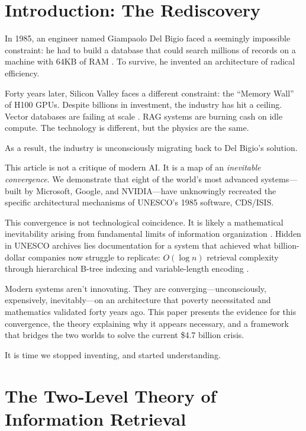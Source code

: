 \documentclass[manuscript,screen,review]{acmart}
\begin{document}
\section{Introduction: The Rediscovery}

In 1985, an engineer named Giampaolo Del Bigio faced a seemingly impossible constraint: he had to build a database that could search millions of records on a machine with 64KB of RAM \cite{delbigio1995}. To survive, he invented an architecture of radical efficiency.

Forty years later, Silicon Valley faces a different constraint: the ``Memory Wall'' of H100 GPUs. Despite billions in investment, the industry has hit a ceiling. Vector databases are failing at scale \cite{bruckhaus2024}. RAG systems are burning cash on idle compute. The technology is different, but the physics are the same.

As a result, the industry is unconsciously migrating back to Del Bigio's solution.

This article is not a critique of modern AI. It is a map of an \textit{inevitable convergence}. We demonstrate that eight of the world's most advanced systems---built by Microsoft, Google, and NVIDIA---have unknowingly recreated the specific architectural mechanisms of UNESCO's 1985 software, CDS/ISIS.

This convergence is not technological coincidence. It is likely a mathematical inevitability arising from fundamental limits of information organization \cite{weller2025}. Hidden in UNESCO archives lies documentation for a system that achieved what billion-dollar companies now struggle to replicate: $O(\log n)$ retrieval complexity through hierarchical B-tree indexing and variable-length encoding \cite{unesco1989}.

Modern systems aren't innovating. They are converging---unconsciously, expensively, inevitably---on an architecture that poverty necessitated and mathematics validated forty years ago. This paper presents the evidence for this convergence, the theory explaining why it appears necessary, and a framework that bridges the two worlds to solve the current \$4.7 billion crisis.

It is time we stopped inventing, and started understanding.

\section{The Two-Level Theory of Information Retrieval}
\end{document}
